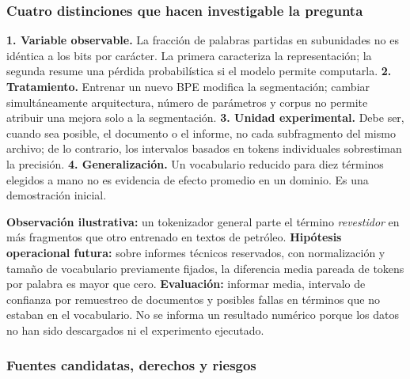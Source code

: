\subsubsection*{Cuatro distinciones que hacen investigable la pregunta}

\textbf{1. Variable observable.} La fracción de palabras partidas en subunidades
no es idéntica a los bits por carácter. La primera caracteriza la representación;
la segunda resume una pérdida probabilística si el modelo permite computarla.
\textbf{2. Tratamiento.} Entrenar un nuevo BPE modifica la segmentación; cambiar
simultáneamente arquitectura, número de parámetros y corpus no permite atribuir
una mejora solo a la segmentación.
\textbf{3. Unidad experimental.} Debe ser, cuando sea posible, el documento o
el informe, no cada subfragmento del mismo archivo; de lo contrario,
los intervalos basados en tokens individuales sobrestiman la precisión.
\textbf{4. Generalización.} Un vocabulario reducido para diez términos elegidos a mano
no es evidencia de efecto promedio en un dominio. Es una demostración inicial.

\begin{ejemplo}
\textbf{Observación ilustrativa:} un tokenizador general parte el término
\emph{revestidor} en más fragmentos que otro entrenado en textos de petróleo.
\textbf{Hipótesis operacional futura:} sobre informes técnicos reservados,
con normalización y tamaño de vocabulario previamente fijados,
la diferencia media pareada de tokens por palabra es mayor que cero.
\textbf{Evaluación:} informar media, intervalo de confianza por remuestreo de
documentos y posibles fallas en términos que no estaban en el vocabulario.
No se informa un resultado numérico porque los datos no han sido descargados
ni el experimento ejecutado.
\end{ejemplo}

\subsubsection*{Fuentes candidatas, derechos y riesgos}

